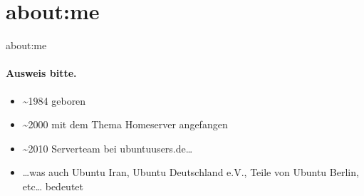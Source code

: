 \section{about:me}

\begin{frame}{about:me}
\framesubtitle{Ausweis bitte.}
\begin{itemize}
\item \textasciitilde{}1984 geboren
\pause
\item \textasciitilde{}2000 mit dem Thema Homeserver angefangen
\pause
\item \textasciitilde{}2010 Serverteam bei ubuntuusers.de…
\pause
\item …was auch Ubuntu Iran, Ubuntu Deutschland e.V., Teile von Ubuntu Berlin, etc… bedeutet
\end{itemize}
\end{frame}
